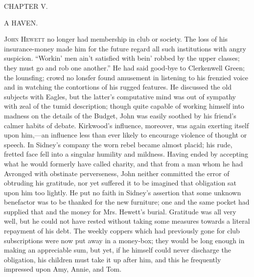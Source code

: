 {}

{CHAPTER V.}

A HAVEN.

\textsc{John Hewett} no longer had membership in club or society. The
loss of his insurance-money made him for the future regard all such
institutions with angry suspicion. ``Workin' men ain't satisfied with
bein' robbed by the upper classes; they must go and rob one another.''
He had said good-bye to Clerkenwell Green; the lounsfing; crowd no
lonsfer found amusement in listening to his frenzied voice and in
watching the contortions of his rugged features. He discussed the old
subjects with Eagles, but the latter's computative mind was out of
sympathy with zeal of the tumid description; though quite capable of
working himself into madness on the details of the Budget, John was
easily soothed by his friend's calmer habits of debate. Kirkwood's
influence, moreover, was again exerting itself {}upon him,---an
influence less than ever likely to encourage violence of thought or
speech. In Sidney's company the worn rebel became almost placid; his
rude, fretted face fell into a singular humility and mildness. Having
ended by accepting what he would formerly have called charity, and that
from a man whom he had Avronged with obstinate perverseness, John
neither committed the error of obtruding his gratitude, nor yet suffered
it to be imagined that obligation sat upon him too lightly. He put no
faith in Sidney's assertion that some unknown benefactor was to be
thanked for the new furniture; one and the same pocket had supplied that
and the money for Mrs. Hewett's burial. Gratitude was all very well, but
he could not have rested without taking some measures towards a literal
repayment of his debt. The weekly coppers which had previously gone for
club subscriptions were now put away in a money-box; they would be long
enough in making an appreciable sum, but yet, if he himself could never
discharge the obligation, his children must take it up after him, and
this he frequently impressed upon Amy, Annie, and Tom.

